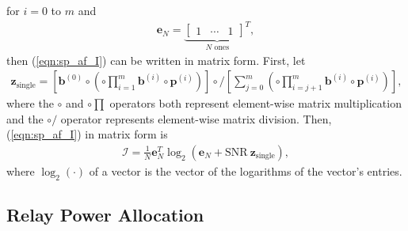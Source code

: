 for $i = 0$ to $m$ and
\begin{eqnarray}
\mathbf{e}_N = \underbrace{ \left[ \begin{array}{ccc}
1 & \cdots & 1
\end{array}
\right]^T}_{\mbox{$N$ ones}},
\end{eqnarray}
then (\ref{eqn:sp_af_I}) can be written in matrix form.  First, let
\begin{eqnarray}
\mathbf{z}_{\mbox{single}} = \left[ \mathbf{b}^{(0)} \circ \left( \circ \prod_{i=1}^m \mathbf{b}^{(i)} \circ  \mathbf{p}^{(i)}  \right) \right] \circ / 
\left[ \sum_{j=0}^{m} \left(\circ \prod_{i=j+1}^{m}  \mathbf{b}^{(i)} \circ \mathbf{p}^{(i)} \right) \right],
\end{eqnarray}
where the $\circ$ and $\circ \prod$ operators both represent element-wise matrix multiplication and the $\circ /$ operator represents element-wise matrix division.  Then, (\ref{eqn:sp_af_I}) in matrix form is
\begin{eqnarray}
\mathcal{I} = \frac{1}{N}\mathbf{e}_N^T  \log_2 \left( \mathbf{e}_N + \mbox{SNR} \: \mathbf{z}_{\mbox{single}} \right),
\label{eqn:sp_af_I_matrix}
\end{eqnarray}
where $\log_2\left( \cdot \right)$ of a vector is the vector of the logarithms of the vector's entries.

\subsection{Relay Power Allocation}
\label{subsec:sp_af_rpa}

